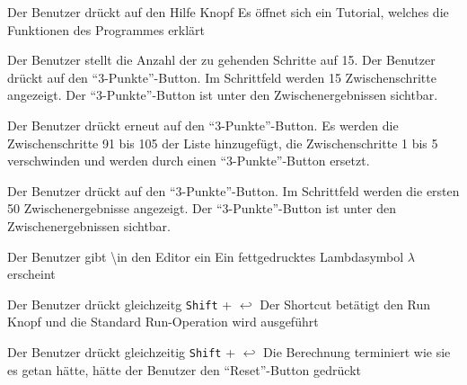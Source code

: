 \documentclass[parskip=full,11pt,twoside]{scrartcl}
\begin{document}
{Der Benutzer drückt auf den Hilfe Knopf}
{Es öffnet sich ein Tutorial, welches die Funktionen des Programmes erklärt}


{Der Benutzer stellt die Anzahl der zu gehenden Schritte auf 15. Der Benutzer drückt auf den \enquote {3-Punkte}-Button.}
{Im Schrittfeld werden 15 Zwischenschritte angezeigt. Der \enquote {3-Punkte}-Button ist unter den Zwischenergebnissen sichtbar.}

{Der Benutzer drückt erneut auf den \enquote {3-Punkte}-Button.}
{Es werden die Zwischenschritte 91 bis 105 der Liste hinzugefügt, die Zwischenschritte 1 bis 5 verschwinden und werden durch einen \enquote {3-Punkte}-Button ersetzt.}

{Der Benutzer drückt auf den \enquote {3-Punkte}-Button.}
{Im Schrittfeld werden die ersten 50 Zwischenergebnisse angezeigt. Der \enquote {3-Punkte}-Button ist unter den Zwischenergebnissen sichtbar.}


{Der Benutzer gibt \textbackslash in den Editor ein}
{Ein fettgedrucktes Lambdasymbol $\lambda$ erscheint}

{Der Benutzer drückt gleichzeitg \texttt{Shift} + $\hookleftarrow$ }
{Der Shortcut betätigt den Run Knopf und die Standard Run-Operation wird ausgeführt}

{Der Benutzer drückt gleichzeitig \texttt{Shift} + $\hookleftarrow$ }
{Die Berechnung terminiert wie sie es getan hätte, hätte der Benutzer den \enquote{Reset}-Button gedrückt}
\end{document}
